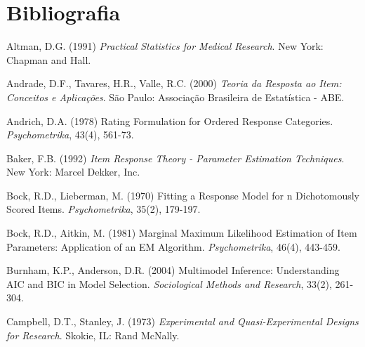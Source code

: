 


%
%
%



\chapter*{Bibliografia}


\noindent
Altman, D.G. (1991) \textit{Practical Statistics for Medical Research}. New York: Chapman and Hall.

\noindent
Andrade, D.F., Tavares, H.R., Valle, R.C. (2000) \textit{Teoria da Resposta ao Item: Conceitos e Aplicações}. São Paulo: Associação Brasileira de Estatística - ABE.

\noindent
Andrich, D.A. (1978) Rating Formulation for Ordered Response Categories. \textit{Psychometrika}, 43(4), 561-73.

\noindent
Baker, F.B. (1992) \textit{Item Response Theory - Parameter Estimation Techniques}. New York: Marcel Dekker, Inc.

\noindent
Bock, R.D., Lieberman, M. (1970) Fitting a Response Model for n Dichotomously Scored Items. \textit{Psychometrika}, 35(2), 179-197.

\noindent
Bock, R.D., Aitkin, M. (1981) Marginal Maximum Likelihood Estimation of Item Parameters: Application of an EM Algorithm. \textit{Psychometrika}, 46(4), 443-459.

\noindent
Burnham, K.P., Anderson, D.R. (2004) Multimodel Inference: Understanding AIC and BIC in Model Selection. \textit{Sociological Methods and Research}, 33(2), 261-304.

\noindent
Campbell, D.T., Stanley, J. (1973) \textit{Experimental and Quasi-Experimental Designs for Research}. Skokie, IL: Rand McNally.





